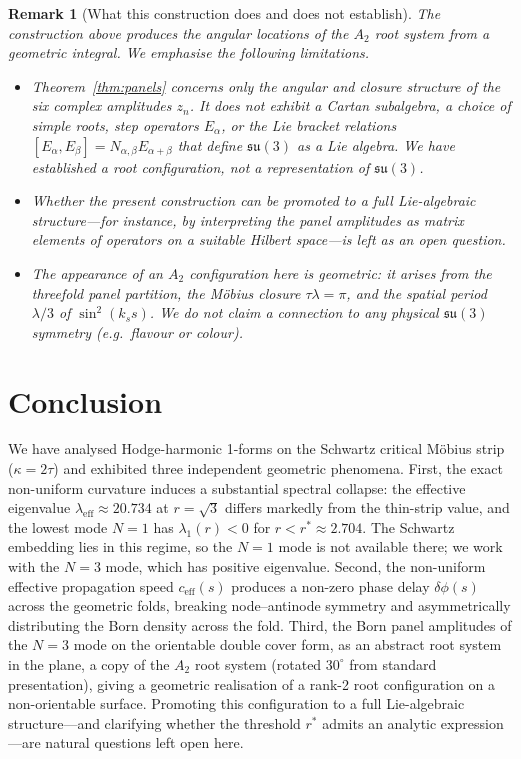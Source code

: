 \documentclass[11pt,a4paper]{article}
\newtheorem{remark}{Remark}
\begin{document}
\begin{remark}[What this construction does and does not establish]
The construction above produces the angular locations of the $A_{2}$ root system from a geometric integral. We emphasise the following limitations.
\begin{itemize}
\item Theorem~\ref{thm:panels} concerns only the angular and closure structure of the six complex amplitudes $z_{n}$. It does not exhibit a Cartan subalgebra, a choice of simple roots, step operators $E_{\alpha}$, or the Lie bracket relations $[E_{\alpha},E_{\beta}]=N_{\alpha,\beta}E_{\alpha+\beta}$ that define $\mathfrak{su}(3)$ as a Lie algebra. We have established a root configuration, not a representation of $\mathfrak{su}(3)$.
\item Whether the present construction can be promoted to a full Lie-algebraic structure---for instance, by interpreting the panel amplitudes as matrix elements of operators on a suitable Hilbert space---is left as an open question.
\item The appearance of an $A_{2}$ configuration here is geometric: it arises from the threefold panel partition, the M\"obius closure $\tau\lambda=\pi$, and the spatial period $\lambda/3$ of $\sin^{2}(k_{s}s)$. We do not claim a connection to any physical $\mathfrak{su}(3)$ symmetry (e.g.\ flavour or colour).
\end{itemize}
\end{remark}

\section{Conclusion}
We have analysed Hodge-harmonic 1-forms on the Schwartz critical M\"obius strip ($\kappa = 2\tau$) and exhibited three independent geometric phenomena. First, the exact non-uniform curvature induces a substantial spectral collapse: the effective eigenvalue $\lambda_{\text{eff}} \approx 20.734$ at $r=\sqrt{3}$ differs markedly from the thin-strip value, and the lowest mode $N=1$ has $\lambda_{1}(r)<0$ for $r<r^{*}\approx 2.704$. The Schwartz embedding lies in this regime, so the $N=1$ mode is not available there; we work with the $N=3$ mode, which has positive eigenvalue. Second, the non-uniform effective propagation speed $c_{\text{eff}}(s)$ produces a non-zero phase delay $\delta\phi(s)$ across the geometric folds, breaking node--antinode symmetry and asymmetrically distributing the Born density across the fold. Third, the Born panel amplitudes of the $N=3$ mode on the orientable double cover form, as an abstract root system in the plane, a copy of the $A_{2}$ root system (rotated $30^\circ$ from standard presentation), giving a geometric realisation of a rank-2 root configuration on a non-orientable surface. Promoting this configuration to a full Lie-algebraic structure---and clarifying whether the threshold $r^{*}$ admits an analytic expression---are natural questions left open here.
\end{document}
